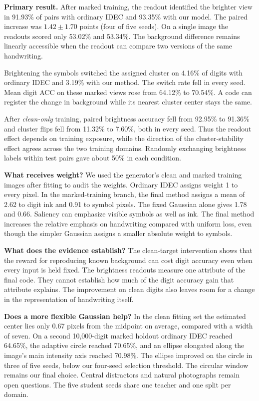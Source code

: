 \documentclass[11pt,letterpaper]{article}
\newcommand{\sect}[1]{\vspace{3pt}{\sffamily\large\bfseries\color{ink}#1}\par}
\begin{document}
\textbf{Primary result.} After marked training, the readout identified the brighter view in 91.93\% of pairs with ordinary IDEC and 93.35\% with our model. The paired increase was $1.42\pm1.70$ points (four of five seeds). On a single image the readouts scored only 53.02\% and 53.34\%. The background difference remains linearly accessible when the readout can compare two versions of the same handwriting.

Brightening the symbols switched the assigned cluster on 4.16\% of digits with ordinary IDEC and 3.19\% with our method. The switch rate fell in every seed. Mean digit ACC on these marked views rose from 64.12\% to 70.54\%. A code can register the change in background while its nearest cluster center stays the same.

After \emph{clean-only} training, paired brightness accuracy fell from 92.95\% to 91.36\% and cluster flips fell from 11.32\% to 7.60\%, both in every seed. Thus the readout effect depends on training exposure, while the direction of the cluster-stability effect agrees across the two training domains. Randomly exchanging brightness labels within test pairs gave about 50\% in each condition.

\newpage
\sect{7 \quad Limitations and conclusion}
\textbf{What receives weight?} We used the generator's clean and marked training images after fitting to audit the weights. Ordinary IDEC assigns weight 1 to every pixel. In the marked-training branch, the final method assigns a mean of 2.62 to digit ink and 0.91 to symbol pixels. The fixed Gaussian alone gives 1.78 and 0.66. Saliency can emphasize visible symbols as well as ink. The final method increases the relative emphasis on handwriting compared with uniform loss, even though the simpler Gaussian assigns a smaller absolute weight to symbols.

\textbf{What does the evidence establish?} The clean-target intervention shows that the reward for reproducing known background can cost digit accuracy even when every input is held fixed. The brightness readouts measure one attribute of the final code. They cannot establish how much of the digit accuracy gain that attribute explains. The improvement on clean digits also leaves room for a change in the representation of handwriting itself.

\textbf{Does a more flexible Gaussian help?} In the clean fitting set the estimated center lies only 0.67 pixels from the midpoint on average, compared with a width of seven. On a second 10,000-digit marked holdout ordinary IDEC reached 64.65\%, the adaptive circle reached 70.65\%, and an ellipse elongated along the image's main intensity axis reached 70.98\%. The ellipse improved on the circle in three of five seeds, below our four-seed selection threshold. The circular window remains our final choice. Central distractors and natural photographs remain open questions. The five student seeds share one teacher and one split per domain.
\end{document}
